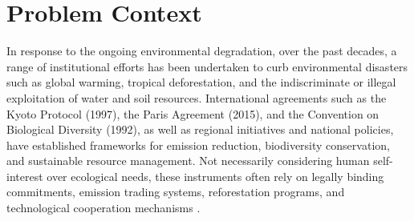 \section{Problem Context}







In response to the ongoing environmental degradation, over the past decades, a range of institutional efforts has been undertaken to curb environmental disasters such as global warming, tropical deforestation, and the indiscriminate or illegal exploitation of water and soil resources. International agreements such as the Kyoto Protocol (1997), the Paris Agreement (2015), and the Convention on Biological Diversity (1992), as well as regional initiatives and national policies, have established frameworks for emission reduction, biodiversity conservation, and sustainable resource management. Not necessarily considering human self-interest over ecological needs, these instruments often rely on legally binding commitments, emission trading systems, reforestation programs, and technological cooperation mechanisms \cite{easterly2013tyranny}.

